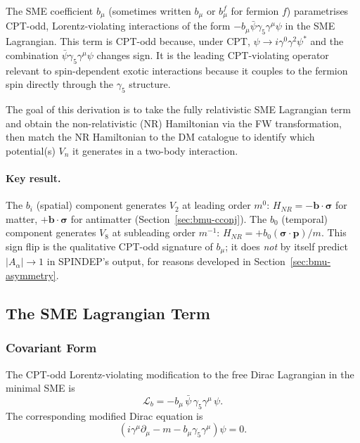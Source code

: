 \documentclass[main]{subfiles}
\begin{document}
The SME coefficient $b_\mu$ (sometimes written $b_\mu$ or $b_\mu^f$ for
fermion $f$) parametrises CPT-odd, Lorentz-violating interactions of the
form $-b_\mu\bar\psi\gamma_5\gamma^\mu\psi$ in the SME Lagrangian. This term
is CPT-odd because, under CPT, $\psi\to i\gamma^0\gamma^2\psi^*$ and the
combination $\bar\psi\gamma_5\gamma^\mu\psi$ changes sign. It is the leading
CPT-violating operator relevant to spin-dependent exotic interactions because
it couples to the fermion spin directly through the $\gamma_5$ structure.

The goal of this derivation is to take the fully relativistic SME Lagrangian
term and obtain the non-relativistic (NR) Hamiltonian via the FW
transformation, then match the NR Hamiltonian to the DM catalogue to identify
which potential(s) $V_n$ it generates in a two-body interaction.

\paragraph{Key result.} The $b_i$ (spatial) component generates $V_2$ at
leading order $m^0$: $H_{NR}=-\mathbf b\cdot\boldsymbol\sigma$ for matter,
$+\mathbf b\cdot\boldsymbol\sigma$ for antimatter (Section~\ref{sec:bmu-cconj}).
The $b_0$ (temporal) component generates $V_8$ at subleading order
$m^{-1}$: $H_{NR}=+b_0(\boldsymbol\sigma\cdot\mathbf p)/m$. This sign flip is
the qualitative CPT-odd signature of $b_\mu$; it does \emph{not} by itself
predict $|A_\alpha|\to 1$ in SPINDEP's output, for reasons developed in
Section~\ref{sec:bmu-asymmetry}.

\subsection{The SME Lagrangian Term}

\subsubsection{Covariant Form}

The CPT-odd Lorentz-violating modification to the free Dirac Lagrangian in
the minimal SME is
\begin{equation}
  \mathcal{L}_b = -b_\mu\,\bar\psi\,\gamma_5\gamma^\mu\,\psi. \label{eq:Lb}
\end{equation}
The corresponding modified Dirac equation is
\begin{equation}
  \left(i\gamma^\mu\partial_\mu - m - b_\mu\gamma_5\gamma^\mu\right)\psi = 0.
\end{equation}
\end{document}
